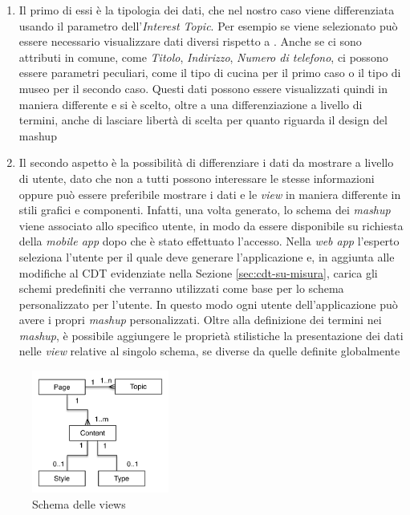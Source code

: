 \begin{enumerate}
	\item
	Il primo di essi è la tipologia dei dati, che nel nostro caso viene differenziata usando il parametro dell'\emph{Interest Topic}.
	Per esempio se viene selezionato  può essere necessario visualizzare dati diversi rispetto a . Anche se ci sono attributi in comune, come \emph{Titolo}, \emph{Indirizzo}, \emph{Numero di telefono}, ci possono essere parametri peculiari, come il tipo di cucina per il primo caso o il tipo di museo per il secondo caso. Questi dati possono essere visualizzati quindi in maniera differente e si è scelto, oltre a una differenziazione a livello di termini, anche di lasciare libertà di scelta per quanto riguarda il design del mashup
	\item
	Il secondo aspetto è la possibilità di differenziare i dati da mostrare a livello di utente, dato che non a tutti possono interessare le stesse informazioni oppure può essere preferibile mostrare i dati e le \emph{view} in maniera differente in stili grafici e componenti. Infatti, una volta generato, lo schema dei \emph{mashup} viene associato allo specifico utente, in modo da essere disponibile su richiesta della \emph{mobile app} dopo che è stato effettuato l'accesso.
	Nella \emph{web app} l'esperto seleziona l'utente per il quale deve generare l'applicazione e, in aggiunta alle modifiche al CDT evidenziate nella Sezione \ref{sec:cdt-su-misura}, carica gli schemi predefiniti che verranno utilizzati come base per lo schema personalizzato per l'utente. In questo modo ogni utente dell'applicazione può avere i propri \emph{mashup} personalizzati.
	Oltre alla definizione dei termini nei \emph{mashup}, è possibile aggiungere le proprietà stilistiche la presentazione dei dati nelle \emph{view} relative al singolo schema, se diverse da quelle definite globalmente
\end{enumerate}

\begin{figure}[ht]
	\centering
	\includegraphics[width=0.4\textwidth]{3-metodologia-camus/Immagini/view-schema.png}
	\caption{Schema delle views}\label{fig:view-schema}
\end{figure}

